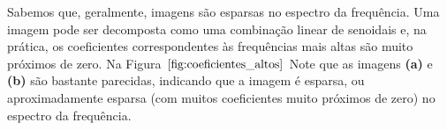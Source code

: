 Sabemos que, geralmente, imagens são esparsas no espectro da frequência. Uma imagem pode ser decomposta como uma combinação linear de senoidais e, na prática, os coeficientes correspondentes às frequências mais altas são muito próximos de zero. Na Figura $\ref{fig:coeficientes_altos}$   Note que as imagens {\bf (a)} e {\bf (b)} são bastante parecidas, indicando que a imagem é esparsa, ou aproximadamente esparsa (com muitos coeficientes muito próximos de zero) no espectro da frequência. 

